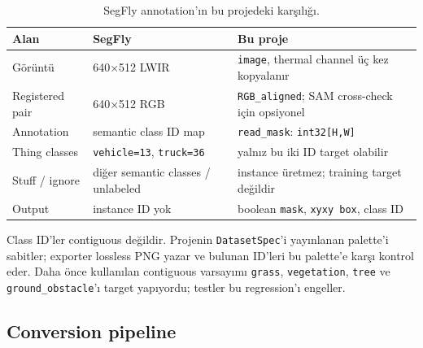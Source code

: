 \begin{table}[H]
  \centering
  \caption{SegFly annotation'ın bu projedeki karşılığı.}
  \label{tab:segfly-annotation}
  \small
  \begin{tabular}{@{}p{31mm}p{43mm}p{67mm}@{}}
    \toprule
    Alan & SegFly & Bu proje \\
    \midrule
    Görüntü & 640×512 LWIR & \texttt{image}, thermal channel üç kez kopyalanır \\
    Registered pair & 640×512 RGB & \texttt{RGB\_aligned}; SAM cross-check için opsiyonel \\
    Annotation & semantic class ID map & \texttt{read\_mask}: \texttt{int32[H,W]} \\
    Thing classes & \texttt{vehicle=13}, \texttt{truck=36} & yalnız bu iki ID target olabilir \\
    Stuff / ignore & diğer semantic classes / unlabeled & instance üretmez; training target değildir \\
    Output & instance ID yok & boolean \texttt{mask}, \texttt{xyxy box}, class ID \\
    \bottomrule
  \end{tabular}
\end{table}

Class ID'ler contiguous değildir. Projenin \texttt{DatasetSpec}'i
yayınlanan palette'i sabitler; exporter lossless PNG yazar ve bulunan
ID'leri bu palette'e karşı kontrol eder. Daha önce kullanılan contiguous
varsayımı \texttt{grass}, \texttt{vegetation}, \texttt{tree} ve
\texttt{ground\_obstacle}'ı target yapıyordu; testler bu regression'ı
engeller.

\subsection{Conversion pipeline}

